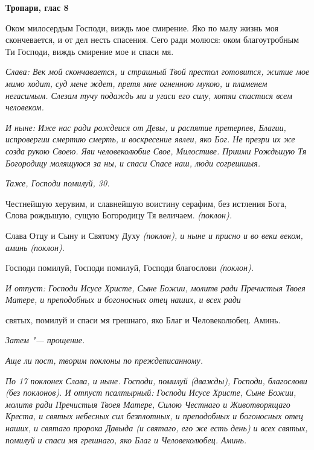  

\bfseries Тропари, глас 8\normalfont{}


   Оком милосердым Господи, виждь мое смирение. Яко по малу жизнь
моя скончевается, и от дел несть спасения. Сего ради молюся: оком
благоутробным Ти Господи, виждь смирение мое и спаси мя.


 \itshape Слава:\normalfont{} Век мой скончавается, и страшный Твой престол готовится, житие
мое мимо ходит, суд мене ждет, претя мне огненною мукою, и пламенем
негасимым. Слезам тучу подаждь ми и угаси его силу, хотяи спастися всем
человеком.


 \itshape И ныне:\normalfont{} Иже нас ради рождеися от Девы, и распятие претерпев, Благии,
испровергии смертию смерть, и воскресение явлеи, яко Бог. Не презри их же
созда рукою Своею. Яви человеколюбие Свое, Милостиве. Приими
Рождьшую Тя Богородицу молящуюся за ны, и спаси Спасе наш, люди
согрешшыя.


 \itshape Таже,\normalfont{} Господи помилуй, \itshape 30.\normalfont{}


   Честнейшую херувим, и славнейшую воистину серафим, без истления
Бога, Слова рождьшую, сущую Богородицу Тя величаем. \itshape (поклон)\normalfont{}.


   Слава Отцу и Сыну и Святому Духу \itshape (поклон)\normalfont{}, и ныне и присно и во веки
веком, аминь \itshape (поклон)\normalfont{}.


   Господи помилуй, Господи помилуй, Господи благослови \itshape (поклон)\normalfont{}.


 \itshape И отпуст:\normalfont{} Господи Исусе Христе, Сыне Божии, молитв ради Пречистыя
Твоея Матере, и преподобных и богоносных отец наших, и всех ради

святых, помилуй и спаси мя грешнаго, яко Благ и Человеколюбец.
Аминь.


 \itshape Затем "--- прощение.\normalfont{}


 \itshape Аще ли пост, творим поклоны по преждеписанному.\normalfont{}


 \itshape По 17 поклонех\normalfont{} \itshape Слава, и ныне.\normalfont{} Господи, помилуй \itshape (дважды)\normalfont{}, Господи,
благослови \itshape (без поклонов). И отпуст псалтырный:\normalfont{} Господи Исусе Христе,
Сыне Божии, молитв ради Пречистыя Твоея Матере, Силою Честнаго и
Животворящаго Креста, и святых небесных сил безплотных, и преподобных
и богоносных отец наших, и святаго пророка Давыда \itshape (и святаго, его же
есть день)\normalfont{} и всех святых, помилуй и спаси мя грешнаго, яко Благ и
Человеколюбец. Аминь.


